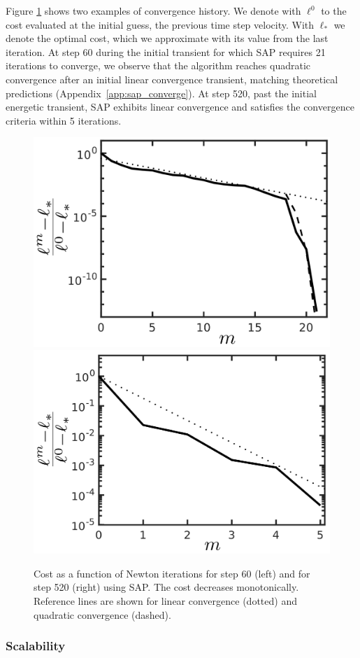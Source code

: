 Figure \ref{fig:clutter_line_search} shows two examples of convergence history.
We denote with $\ell^0$ to the cost evaluated at the initial guess, the previous
time step velocity. With $\ell_*$ we denote the optimal cost, which we
approximate with its value from the last iteration. At step 60 during the
initial transient for which SAP requires 21 iterations to converge, we observe
that the algorithm reaches quadratic convergence after an initial linear
convergence transient, matching theoretical predictions
(Appendix~\ref{app:sap_converge}). At step 520, past the initial energetic
transient, SAP exhibits linear convergence and satisfies the convergence
criteria within 5 iterations.
\begin{figure}[!h]
	\centering
    \includegraphics[height=0.34\columnwidth]{figures/clutter/normalized_cost_step60_21its_wwalls_latex_labels.png}
	\includegraphics[height=0.34\columnwidth]{figures/clutter/normalized_cost_step520_5its_wwalls_latex_labels.png}    
	\caption{\label{fig:clutter_line_search} 
	Cost as a function of Newton iterations for step 60 (left) and for step 520
	(right) using SAP. The cost decreases monotonically. Reference lines are
	shown for linear convergence (dotted) and quadratic convergence (dashed).}
\end{figure}

\subsubsection{Scalability}

